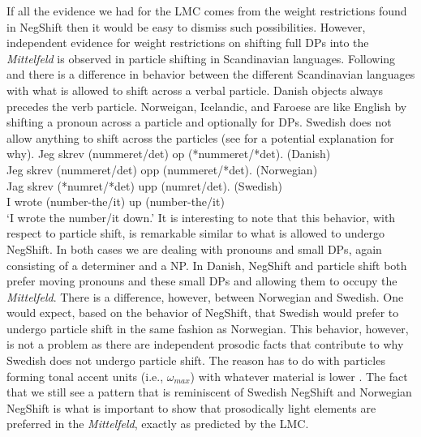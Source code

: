 \documentclass[12pt, letterpaper]{article}
\begin{document}
If all the evidence we had for the LMC comes from the weight restrictions found in NegShift then it would be easy to dismiss such possibilities. However, independent evidence for weight restrictions on shifting full DPs into the \emph{Mittelfeld} is observed in particle shifting in Scandinavian languages. Following \citet[2]{holmbergRemarksHolmbergGeneralization1999} and \citet{faarlundSyntaxMainlandScandinavian2019} there is a difference in behavior between the different Scandinavian languages with what is allowed to shift across a verbal particle. Danish objects always precedes the verb particle. Norweigan, Icelandic, and Faroese are like English by shifting a pronoun across a particle and optionally for DPs. Swedish does not allow anything to shift across the particles (see \cite{erteschik-shirVariationMainlandScandinavian2020} for a potential explanation for why).
\ea \gllll Jeg skrev (nummeret/det) op (*nummeret/*det). \hfill (Danish)\\
		Jeg skrev (nummeret/det) opp (nummeret/*det). \hfill (Norwegian)\\
		Jag skrev (*numret/*det) upp (numret/det). \hfill (Swedish)\\
		I wrote (number-the/it) up (number-the/it)\\
\glt `I wrote the number/it down.'
\z 
It is interesting to note that this behavior, with respect to particle shift, is remarkable similar to what is allowed to undergo NegShift. In both cases we are dealing with pronouns and small DPs, again consisting of a determiner and a NP. In Danish, NegShift and particle shift both prefer moving pronouns and these small DPs and allowing them to occupy the \emph{Mittelfeld}. There is a difference, however, between Norwegian and Swedish. One would expect, based on the behavior of NegShift, that Swedish would prefer to undergo particle shift in the same fashion as Norwegian. This behavior, however, is not a problem as there are independent prosodic facts that contribute to why Swedish does not undergo particle shift. The reason has to do with particles forming tonal accent units (i.e., $\omega_{max}$) with whatever material is lower \citep[see]{erteschik-shirVariationMainlandScandinavian2020}. The fact that we still see a pattern that is reminiscent of Swedish NegShift and Norwegian NegShift is what is important to show that prosodically light elements are preferred in the \emph{Mittelfeld}, exactly as predicted by the LMC. 
\end{document}
